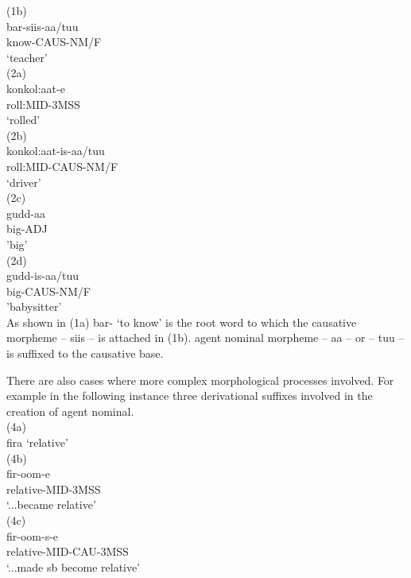 \documentclass[11pt,a4paper]{article}
\begin{document}
(1b) \\
\indent	bar-siis-aa/tuu\\
\indent know-CAUS-NM/F\\
\indent ‘teacher’\\

(2a) 	\\
\indent konkol:aat-e\\
\indent roll:MID-3MSS\\
\indent ‘rolled’\\

(2b) \\	
\indent konkol:aat-is-aa/tuu\\
\indent roll:MID-CAUS-NM/F\\
\indent ‘driver’\\

(2c) \\
\indent gudd-aa\\
\indent big-ADJ\\
\indent 'big'\\

(2d)\\
\indent gudd-is-aa/tuu\\
\indent big-CAUS-NM/F\\
\indent 'babysitter'\\

As shown in (1a) bar- ‘to know’ is the root word to which the causative morpheme – siis – is attached in (1b). agent nominal morpheme – aa – or – tuu – is suffixed to the causative base. 

There are also cases where more complex morphological processes involved. For example in the following instance three derivational suffixes involved in the creation of agent nominal.\\

(4a) 	\\
\indent fira ‘relative’\\

(4b) 	\\
\indent fir-oom-e\\
\indent relative-MID-3MSS\\
\indent ‘...became relative’\\

(4c)	\\
\indent fir-oom-s-e\\
\indent relative-MID-CAU-3MSS\\
\indent ‘...made sb become relative’\\
\end{document}
